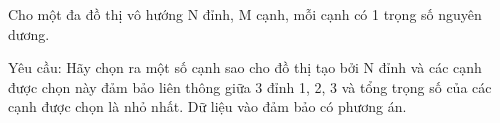 Cho một đa đồ thị vô hướng N đỉnh, M cạnh, mỗi cạnh có 1 trọng số nguyên dương.

Yêu cầu: Hãy chọn ra một số cạnh sao cho đồ thị tạo bởi N đỉnh và các cạnh được chọn này đảm bảo liên thông giữa 3 đỉnh 1, 2, 3 và tổng trọng số của các cạnh được chọn là nhỏ nhất. Dữ liệu vào đảm bảo có phương án.